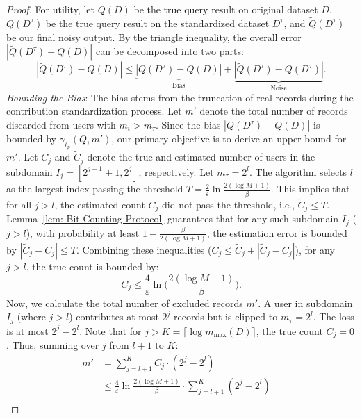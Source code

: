 \begin{proof}
For utility, let $Q(D)$ be the true query result on original dataset $D$, $Q(D^\tau)$ be the true query result on the standardized dataset $D^\tau$, and $\tilde{Q}(D^\tau)$ be our final noisy output. By the triangle inequality, the overall error $|\tilde{Q}(D^\tau) - Q(D)|$ can be decomposed into two parts:
$$|\tilde{Q}(D^\tau) - Q(D)| \le \underbrace{|Q(D^\tau) - Q(D)|}_{\text{Bias}} + \underbrace{|\tilde{Q}(D^\tau) - Q(D^\tau)|}_{\text{Noise}}.$$
\textit{Bounding the Bias}: 
The bias stems from the truncation of real records during the contribution standardization process. Let $m'$ denote the total number of records discarded from users with $m_i > m_\tau$. Since the bias $|Q(D^\tau) - Q(D)|$ is bounded by $\gamma_{\ell_p}( Q, m')$, our primary objective is to derive an upper bound for $m'$.
Let $C_j$ and $\tilde{C}_j$ denote the true and estimated number of users in the subdomain $I_j = [2^{j-1}+1, 2^j]$, respectively. Let $m_\tau = 2^l$. The algorithm selects $l$ as the largest index passing the threshold $T= \frac{2}{\varepsilon}\ln\frac{2(\log M +1)}{\beta}$. This implies that for all $j > l$, the estimated count $\tilde{C}_j$ did {not} pass the threshold, i.e., $\tilde{C}_j \le T$. 
Lemma~\ref{lem: Bit Counting Protocol} guarantees that for any such subdomain $I_j$ ($j > l$), with probability at least $1-\frac{\beta}{2(\log M +1)}$, the estimation error is bounded by $|\tilde{C}_j - C_j| \le T$. Combining these inequalities ($C_j \le \tilde{C}_j + |\tilde{C}_j - C_j|$), for any $j > l$, the true count is bounded by:
$$ C_j \le \frac{4}{\varepsilon}\ln\Big(\frac{2(\log M+1)}{\beta}\Big).
$$
Now, we calculate the total number of excluded records $m'$. A user in subdomain $I_j$ (where $j > l$) contributes at most $2^j$ records but is clipped to $m_\tau = 2^l$. The loss is at most $2^j - 2^l$.
Note that for $j > K = \lceil \log m_{\max}(D) \rceil$, the true count $C_j = 0$. Thus, summing over $j$ from $l+1$ to $K$:
$$\begin{aligned}
m'
&= \sum_{j=l+1}^{K} C_j \cdot (2^j - 2^l) \\
&\le \frac{4}{\varepsilon}\ln\frac{2(\log M +1)}{\beta} \cdot \sum_{j=l+1}^{K} (2^j - 2^l) \quad  \\

\end{aligned}$$
\end{proof}
